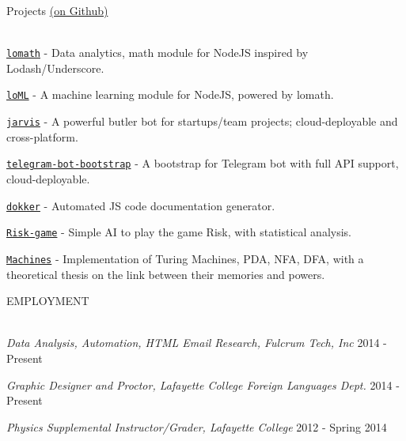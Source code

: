 \documentclass{resume} %
\begin{document}

\begin{rSection}{Projects \href{https://github.com/kengz}{(on Github)}}

{\setlength{\parskip}{1.8pt}

\ \\
{\tt \href{https://github.com/kengz/lomath}{\textcolor{Cerulean}{lomath}}} - Data analytics, math module for NodeJS inspired by Lodash/Underscore.

{\tt \href{https://github.com/kengz/loML}{\textcolor{Cerulean}{loML}}} - A machine learning module for NodeJS, powered by lomath. 

{\tt \href{https://github.com/kengz/jarvis}{\textcolor{Cerulean}{jarvis}}} - A powerful butler bot for startups/team projects; cloud-deployable and cross-platform.

{\tt \href{https://github.com/kengz/telegram-bot-bootstrap}{\textcolor{Cerulean}{telegram-bot-bootstrap}}} - A bootstrap for Telegram bot with full API support, cloud-deployable.

{\tt \href{https://github.com/kengz/dokker}{\textcolor{Cerulean}{dokker}}} - Automated JS code documentation generator.

{\tt \href{https://github.com/kengz/Risk-game}{\textcolor{Cerulean}{Risk-game}}} - Simple AI to play the game Risk, with statistical analysis.

{\tt \href{https://github.com/kengz/Machines}{\textcolor{Cerulean}{Machines}}} - Implementation of Turing Machines, PDA, NFA, DFA, with a theoretical thesis on the link between their memories and powers.
}
\end{rSection}



\begin{rSection}{EMPLOYMENT}

{\setlength{\parskip}{1.8pt}
\ \\
{\sl Data Analysis, Automation, HTML Email Research, Fulcrum Tech, Inc} \hfill  2014 - Present

{\sl Graphic Designer and Proctor, Lafayette College Foreign Languages Dept.} \hfill  2014 - Present

{\sl Physics Supplemental Instructor/Grader, Lafayette College} \hfill  2012 - Spring 2014

}
\end{rSection}
\end{document}
